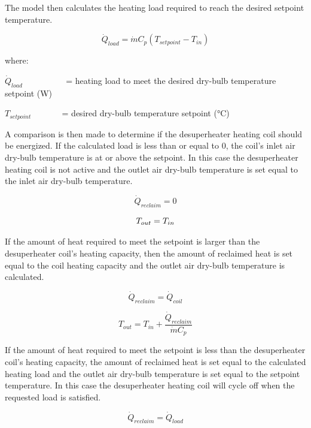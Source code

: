 The model then calculates the heating load required to reach the desired setpoint temperature.

\begin{equation}
{\dot Q_{load}} = \dot m{C_p}\left( {{T_{setpoint}} - {T_{in}}} \right)
\end{equation}

where:

\({\dot Q_{load}}\) ~~~~~~~~~ = heating load to meet the desired dry-bulb temperature setpoint (W)

\({T_{setpoint}}\) ~~~~~~ = desired dry-bulb temperature setpoint (°C)

A comparison is then made to determine if the desuperheater heating coil should be energized. If the calculated load is less than or equal to 0, the coil's inlet air dry-bulb temperature is at or above the setpoint. In this case the desuperheater heating coil is not active and the outlet air dry-bulb temperature is set equal to the inlet air dry-bulb temperature.

\begin{equation}
{\dot Q_{reclaim}} = 0
\end{equation}

\begin{equation}
{T_{out}}{\rm{ }} = {\rm{ }}{T_{in}}
\end{equation}

If the amount of heat required to meet the setpoint is larger than the desuperheater coil's heating capacity, then the amount of reclaimed heat is set equal to the coil heating capacity and the outlet air dry-bulb temperature is calculated.

\begin{equation}
{\dot Q_{reclaim}} = {\dot Q_{coil}}
\end{equation}

\begin{equation}
{T_{out}} = {T_{in}} + \frac{{{{\dot Q}_{reclaim}}}}{{\dot m{C_p}}}
\end{equation}

If the amount of heat required to meet the setpoint is less than the desuperheater coil's heating capacity, the amount of reclaimed heat is set equal to the calculated heating load and the outlet air dry-bulb temperature is set equal to the setpoint temperature. In this case the desuperheater heating coil will cycle off when the requested load is satisfied.

\begin{equation}
{\dot Q_{reclaim}} = {\dot Q_{load}}
\end{equation}

